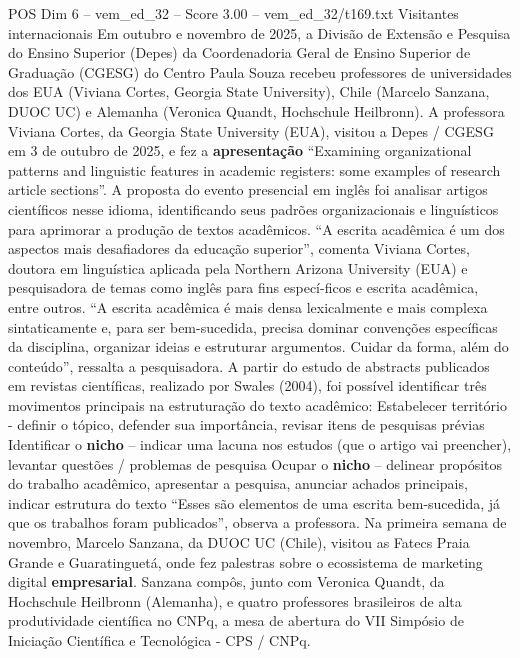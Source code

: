 \begin{textsample}{POS Dim 6 – vem\_ed\_32 – Score 3.00 – vem\_ed\_32/t169.txt}  \label{ex:f6_pos_008}
Visitantes internacionais Em outubro e novembro de 2025, a Divisão de Extensão e Pesquisa do Ensino Superior (Depes) da Coordenadoria Geral de Ensino Superior de Graduação (CGESG) do Centro Paula Souza recebeu professores de universidades dos EUA (Viviana Cortes, Georgia State University), Chile (Marcelo Sanzana, DUOC UC) e Alemanha (Veronica Quandt, Hochschule Heilbronn).
A professora Viviana Cortes, da Georgia State University (EUA), visitou a Depes / CGESG em 3 de outubro de 2025, e fez a \textbf{apresentação} “Examining organizational patterns and linguistic features in academic registers: some examples of research article sections”.
A proposta do evento presencial em inglês foi analisar artigos científicos nesse idioma, identificando seus padrões organizacionais e linguísticos para aprimorar a produção de textos acadêmicos. “A escrita acadêmica é um dos aspectos mais desafiadores da educação superior”, comenta Viviana Cortes, doutora em linguística aplicada pela Northern Arizona University (EUA) e pesquisadora de temas como inglês para fins especí-ficos e escrita acadêmica, entre outros. “A escrita acadêmica é mais densa lexicalmente e mais complexa sintaticamente e, para ser bem-sucedida, precisa dominar convenções específicas da disciplina, organizar ideias e estruturar argumentos.
Cuidar da forma, além do conteúdo”, ressalta a pesquisadora.
A partir do estudo de abstracts publicados em revistas científicas, realizado por Swales (2004), foi possível identificar três movimentos principais na estruturação do texto acadêmico: Estabelecer território - definir o tópico, defender sua importância, revisar itens de pesquisas prévias Identificar o \textbf{nicho} – indicar uma lacuna nos estudos (que o artigo vai preencher), levantar questões / problemas de pesquisa Ocupar o \textbf{nicho} – delinear propósitos do trabalho acadêmico, apresentar a pesquisa, anunciar achados principais, indicar estrutura do texto “Esses são elementos de uma escrita bem-sucedida, já que os trabalhos foram publicados”, observa a professora.
Na primeira semana de novembro, Marcelo Sanzana, da DUOC UC (Chile), visitou as Fatecs Praia Grande e Guaratinguetá, onde fez palestras sobre o ecossistema de marketing digital \textbf{empresarial}.
Sanzana compôs, junto com Veronica Quandt, da Hochschule Heilbronn (Alemanha), e quatro professores brasileiros de alta produtividade científica no CNPq, a mesa de abertura do VII Simpósio de Iniciação Científica e Tecnológica - CPS / CNPq.

\end{textsample}
